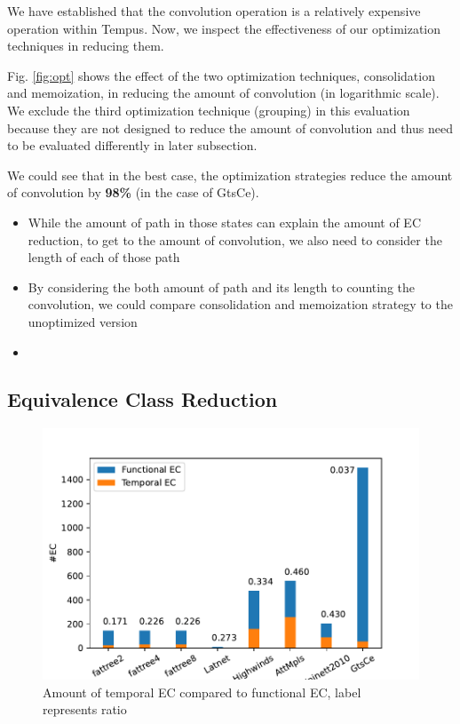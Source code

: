 \documentclass[10pt,sigconf,letterpaper,anonymous,nonacm]{acmart}
\begin{document}
We have established that the convolution operation is a relatively expensive operation within 
Tempus.
Now, we inspect the effectiveness of our optimization techniques in reducing them.

Fig. \ref{fig:opt} shows the effect of the two optimization techniques, consolidation and 
memoization, in reducing the amount of convolution (in logarithmic scale).
We exclude the third optimization technique (grouping) in this evaluation because they are not 
designed to reduce the amount of convolution and thus need to be evaluated differently in later 
subsection.

We could see that in the best case, the optimization strategies reduce the amount of 
convolution by \textbf{98\%} (in the case of GtsCe).


\begin{itemize}
    \item While the amount of path in those states can explain the amount of EC reduction, to get to 
        the amount of convolution, we also need to consider the length of each of those path
    \item By considering the both amount of path and its length to counting the convolution, we could 
        compare consolidation and memoization strategy to the unoptimized version
    \item 
\end{itemize}

\subsection{Equivalence Class Reduction}

\begin{figure}[h]
    \centering
    \includegraphics[scale=0.5]{ec}
    \caption{Amount of temporal EC compared to functional EC, label represents ratio}
    \label{fig:ec}
\end{figure}
\end{document}
